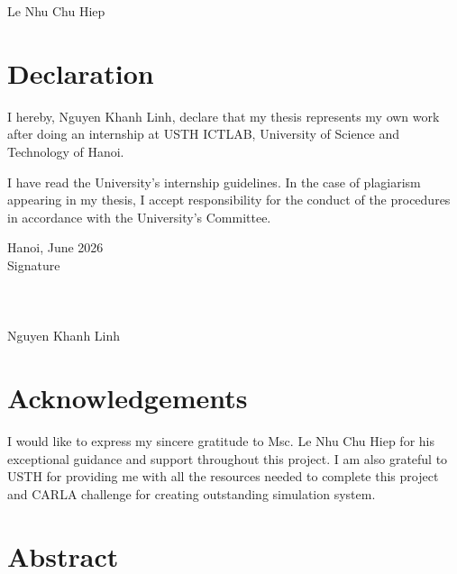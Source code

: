 \documentclass[11pt,a4paper]{report}
\begin{document}
Le Nhu Chu Hiep



\clearpage
{}  %
\setcounter{page}{1}   %


\tableofcontents

\listoffigures
{}
\clearpage

\listoftables
{}

\printglossary[type=\acronymtype,title=List of Abbreviations]




\newpage
\chapter*{Declaration}
I hereby, Nguyen Khanh Linh, declare that my thesis represents my own work after doing an internship at USTH ICTLAB, University of Science and Technology of Hanoi.

I have read the University’s internship guidelines. In the case of plagiarism appearing in my thesis, I accept responsibility for the conduct of the procedures in accordance with the
University’s Committee.

Hanoi, June 2026\\

Signature\\
\\
\\
\\

Nguyen Khanh Linh


\chapter*{Acknowledgements}
 I would like to express my sincere gratitude to Msc. Le Nhu Chu Hiep for his exceptional guidance and support throughout this project. I am also grateful to USTH for providing me with all the resources needed to complete this project and CARLA challenge for creating outstanding simulation system.

\chapter*{Abstract}
\end{document}

